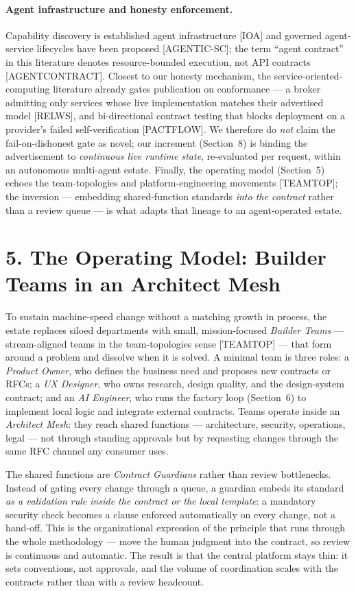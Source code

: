 \documentclass[11pt]{article}
\begin{document}
\paragraph{Agent infrastructure and honesty enforcement.} Capability discovery is established agent
infrastructure [IOA] and governed agent-service lifecycles have been proposed [AGENTIC-SC]; the term
``agent contract'' in this literature denotes resource-bounded execution, not API contracts
[AGENTCONTRACT]. Closest to our honesty mechanism, the service-oriented-computing literature already
gates publication on conformance --- a broker admitting only services whose live implementation matches
their advertised model [RELWS], and bi-directional contract testing that blocks deployment on a
provider's failed self-verification [PACTFLOW]. We therefore do \emph{not} claim the fail-on-dishonest
gate as novel; our increment (Section~8) is binding the advertisement to \emph{continuous live runtime
state}, re-evaluated per request, within an autonomous multi-agent estate. Finally, the operating model
(Section~5) echoes the team-topologies and platform-engineering movements [TEAMTOP]; the inversion ---
embedding shared-function standards \emph{into the contract} rather than a review queue --- is what
adapts that lineage to an agent-operated estate.

\section*{5. The Operating Model: Builder Teams in an Architect Mesh}
To sustain machine-speed change without a matching growth in process, the estate replaces siloed
departments with small, mission-focused \emph{Builder Teams} --- stream-aligned teams in the
team-topologies sense [TEAMTOP] --- that form around a problem and dissolve when it is solved. A
minimal team is three roles: a \emph{Product Owner}, who defines the business
need and proposes new contracts or RFCs; a \emph{UX Designer}, who owns research, design quality, and
the design-system contract; and an \emph{AI Engineer}, who runs the factory loop (Section~6) to
implement local logic and integrate external contracts. Teams operate inside an \emph{Architect Mesh}:
they reach shared functions --- architecture, security, operations, legal --- not through standing
approvals but by requesting changes through the same RFC channel any consumer uses.

The shared functions are \emph{Contract Guardians} rather than review bottlenecks. Instead of gating
every change through a queue, a guardian embeds its standard \emph{as a validation rule inside the
contract or the local template}: a mandatory security check becomes a clause enforced automatically on
every change, not a hand-off. This is the organizational expression of the principle that runs through
the whole methodology --- move the human judgment into the contract, so review is continuous and
automatic. The result is that the central platform stays thin: it sets conventions, not approvals,
and the volume of coordination scales with the contracts rather than with a review headcount.
\end{document}
